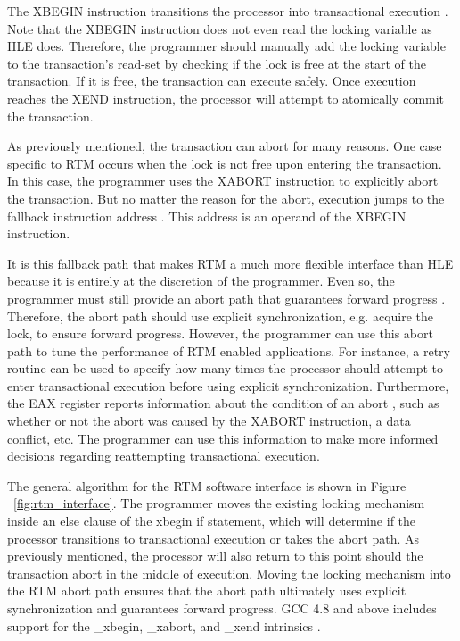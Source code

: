 \documentclass[a4paper]{article}
\begin{document}
\indent 
The XBEGIN instruction transitions the processor into transactional
execution \cite{intel_prog_ref}.  Note that the XBEGIN instruction does not even
read the locking variable as HLE does.  Therefore, the programmer should
manually add the locking variable to the transaction's read-set by checking if
the lock is free at the start of the transaction.  If it is free, the
transaction can execute safely.  Once execution reaches the XEND instruction,
the processor will attempt to atomically commit the transaction.
\par

\indent
As previously mentioned, the transaction can abort for many reasons.
One case specific to RTM occurs when the lock is not free upon entering the
transaction.  In this case, the programmer uses the XABORT instruction to
explicitly abort the transaction.  But no matter the reason for the abort,
execution jumps to the fallback instruction address \cite{intel_prog_ref}.  This
address is an operand of the XBEGIN instruction.
\par

\indent
It is this fallback path that makes RTM a much more flexible interface
than HLE because it is entirely at the discretion of the programmer.  Even so,
the programmer must still provide an abort path that guarantees forward progress
\cite{intel_prog_ref}.  Therefore, the abort path should use explicit
synchronization, e.g. acquire the lock, to ensure forward progress. However, the
programmer can use this abort path to tune the performance of RTM enabled
applications.  For instance, a retry routine can be used to specify how many
times the processor should attempt to enter transactional execution before using
explicit synchronization.  Furthermore, the EAX register reports information
about the condition of an abort \cite{intel_prog_ref}, such as whether or not
the abort was caused by the XABORT instruction, a data conflict, etc.  The
programmer can use this information to make more informed decisions regarding
reattempting transactional execution.
\par

\indent 
The general algorithm for the RTM software interface is shown in Figure
~\ref{fig:rtm_interface}.  The programmer moves the existing locking mechanism
inside an else clause of the xbegin if statement, which will determine if the
processor transitions to transactional execution or takes the abort path.  As
previously mentioned, the processor will also return to this point should the
transaction abort in the middle of execution. Moving the locking mechanism into
the RTM abort path ensures that the abort path ultimately uses explicit
synchronization and guarantees forward progress.  GCC 4.8 and above includes
support for the \_xbegin, \_xabort, and \_xend intrinsics \cite{gcc}.
\end{document}
